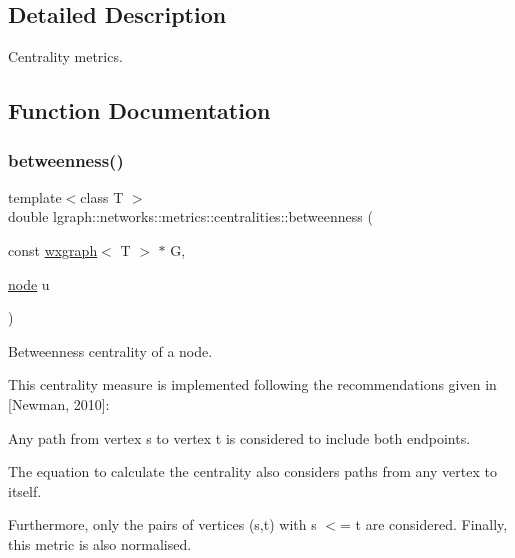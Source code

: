 \subsection{Detailed Description}
Centrality metrics. 

\subsection{Function Documentation}
\mbox{\label{namespacelgraph_1_1networks_1_1metrics_1_1centralities_a5a8a94d9361a49ffa657d8d6541be4be}} 
\subsubsection{\texorpdfstring{betweenness()}{betweenness()}\hspace{0.1cm}{\footnotesize\ttfamily [1/8]}}
{\footnotesize\ttfamily template$<$class T $>$ \\
double lgraph\+::networks\+::metrics\+::centralities\+::betweenness (\begin{DoxyParamCaption}\item[{const \hyperlink{classlgraph_1_1wxgraph}{wxgraph}$<$ T $>$ $\ast$}]{G,  }\item[{\hyperlink{namespacelgraph_a397169dd66adf725210a30fb7251773e}{node}}]{u }\end{DoxyParamCaption})}



Betweenness centrality of a node. 

This centrality measure is implemented following the recommendations given in \mbox{[}Newman, 2010\mbox{]}\+:
\begin{DoxyItemize}
\item Any path from vertex \textquotesingle{}s\textquotesingle{} to vertex \textquotesingle{}t\textquotesingle{} is considered to include both endpoints.
\item The equation to calculate the centrality also considers paths from any vertex to itself.
\end{DoxyItemize}

Furthermore, only the pairs of vertices (s,t) with s $<$= t are considered. Finally, this metric is also normalised.


